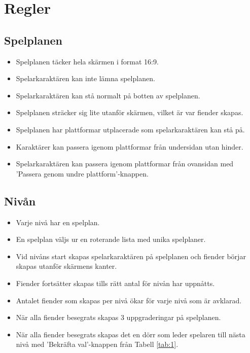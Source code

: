 \documentclass{TDP005mall}
\begin{document}
\section{Regler}
\subsection{Spelplanen}
\begin{itemize}
\item Spelplanen täcker hela skärmen i format 16:9.
\item Spelarkaraktären kan inte lämna spelplanen.
\item Spelarkaraktären kan stå normalt på botten av spelplanen.
\item Spelplanen sträcker sig lite utanför skärmen, vilket är var fiender skapas.
\item Spelplanen har plattformar utplacerade som spelarkaraktären kan stå på.
\item Karaktärer kan passera igenom plattformar från undersidan utan hinder.
\item Spelarkaraktären kan passera igenom plattformar från ovansidan med 'Passera genom undre plattform'-knappen.
\end{itemize}

\subsection{Nivån}
\begin{itemize}
\item Varje nivå har en spelplan.
\item En spelplan väljs ur en roterande lista med unika spelplaner.
\item Vid nivåns start skapas spelarkaraktären på spelplanen och fiender börjar skapas utanför skärmens kanter.
\item Fiender fortsätter skapas tills rätt antal för nivån har uppnåtts.
\item Antalet fiender som skapas per nivå ökar för varje nivå som är avklarad.
\item När alla fiender besegrats skapas 3 uppgraderingar på spelplanen.
\item När alla fiender besegrats skapas det en dörr som leder spelaren till nästa nivå med 'Bekräfta val'-knappen från Tabell \ref{tab:1}.
\end{itemize}
\end{document}
